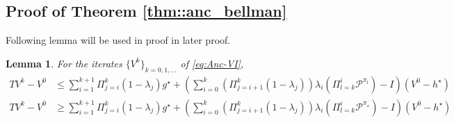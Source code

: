 \documentclass{article} %
\newcommand{\cP}{\mathcal{P}}
\newcommand*{\para}[1]{\left({#1}\right)}
\newtheorem{lemma}{Lemma}
\begin{document}
\subsection{Proof of Theorem \ref{thm::anc_bellman}}
Following lemma will be used in proof in later proof. 
\begin{lemma}\label{lem::anc_bellman}
For the iterates $\{V^k\}_{k=0,1,\dots}$ of \ref{eq:Anc-VI},
 \begin{align*} 
      TV^k-V^0 &\le \sum_{i=1}^{k+1} \Pi^{k}_{j=i} (1-\lambda_j)g^{\star} +\para{\sum_{i=0}^{k} (\Pi^k_{j=i+1} (1-\lambda_j)) \lambda_{i}\para{\Pi^{i}_{l=k}\cP^{\pi_l}}-I}(V^0-h^{\star})
    \\TV^k-V^0 &\ge \sum_{i=1}^{k+1} \Pi^{k}_{j=i} (1-\lambda_j)g^{\star}+\para{\sum_{i=0}^{k} (\Pi^k_{j=i+1} (1-\lambda_j)) \lambda_{i}\para{\Pi^{i}_{l=k}\cP^{\pi_{\star}}}-I}(V^0-h^{\star})
  \end{align*} 
\end{lemma}
\end{document}
